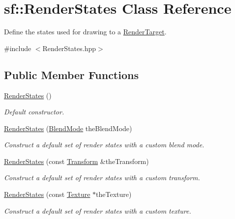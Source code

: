 \hypertarget{classsf_1_1_render_states}{\section{sf\+:\+:Render\+States Class Reference}
\label{classsf_1_1_render_states}
}


Define the states used for drawing to a \hyperlink{classsf_1_1_render_target}{Render\+Target}.  




{\ttfamily \#include $<$Render\+States.\+hpp$>$}

\subsection*{Public Member Functions}
\begin{DoxyCompactItemize}
\item 
\hyperlink{classsf_1_1_render_states_a885bf14070d0d5391f062f62b270b7d0}{Render\+States} ()
\begin{DoxyCompactList}\small\item\em Default constructor. \end{DoxyCompactList}\item 
\hyperlink{classsf_1_1_render_states_a4e3378a224f67513b95d58184e85210c}{Render\+States} (\hyperlink{group__graphics_ga80c52fe2f7050d7f7573b7ed3c995388}{Blend\+Mode} the\+Blend\+Mode)
\begin{DoxyCompactList}\small\item\em Construct a default set of render states with a custom blend mode. \end{DoxyCompactList}\item 
\hyperlink{classsf_1_1_render_states_a3e99cad6ab05971d40357949930ed890}{Render\+States} (const \hyperlink{classsf_1_1_transform}{Transform} \&the\+Transform)
\begin{DoxyCompactList}\small\item\em Construct a default set of render states with a custom transform. \end{DoxyCompactList}\item 
\hyperlink{classsf_1_1_render_states_a8f4ca3be0e27dafea0c4ab8547439bb1}{Render\+States} (const \hyperlink{classsf_1_1_texture}{Texture} $\ast$the\+Texture)
\begin{DoxyCompactList}\small\item\em Construct a default set of render states with a custom texture. \end{DoxyCompactList}\item 

\end{DoxyCompactItemize}
